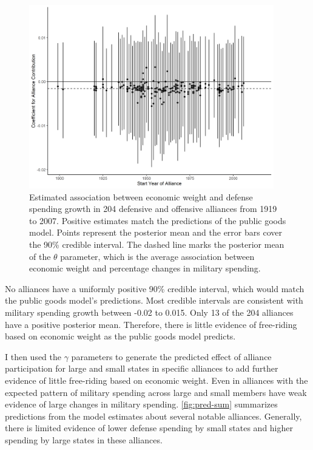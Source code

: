 \documentclass[12pt]{article}
\begin{document}
\begin{figure}[htbp]
	\centering
		\includegraphics[width=0.95\textwidth]{alliance-coefs-year.png}
	\caption{Estimated association between economic weight and defense spending growth in 204 defensive and offensive alliances from 1919 to 2007. Positive estimates match the predictions of the public goods model. Points represent the posterior mean and the error bars cover the 90\% credible interval. The dashed line marks the posterior mean of the $\theta$ parameter, which is the average association between economic weight and percentage changes in military spending.}
	\label{fig:alliance-coefs-year}
\end{figure}


No alliances have a uniformly positive 90\% credible interval, which would match the public goods model's predictions. 
Most credible intervals are consistent with military spending growth between -0.02 to 0.015. 
Only 13 of the 204 alliances have a positive posterior mean. 
Therefore, there is little evidence of free-riding based on economic weight as the public goods model predicts. 


I then used the $\gamma$ parameters to generate the predicted effect of alliance participation for large and small states in specific alliances to add further evidence of little free-riding based on economic weight.
Even in alliances with the expected pattern of military spending across large and small members have weak evidence of large changes in military spending.  
\autoref{fig:pred-sum} summarizes predictions from the model estimates about several notable alliances. 
Generally, there is limited evidence of lower defense spending by small states and higher spending by large states in these alliances. 
\end{document}
